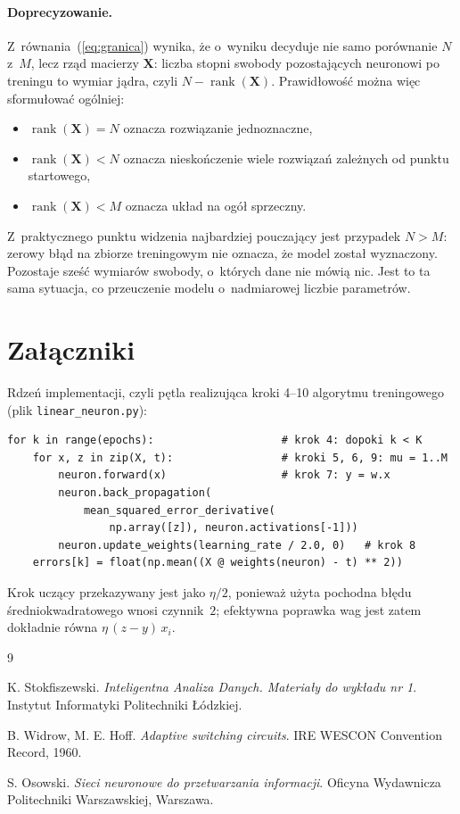 \documentclass[12pt]{article}
\begin{document}
\paragraph{Doprecyzowanie.} Z~równania~(\ref{eq:granica}) wynika, że o~wyniku
decyduje nie samo porównanie $N$ z~$M$, lecz rząd macierzy $\mathbf{X}$: liczba
stopni swobody pozostających neuronowi po treningu to wymiar jądra, czyli
$N - \operatorname{rank}(\mathbf{X})$. Prawidłowość można więc sformułować ogólniej:
\begin{itemize}
\item $\operatorname{rank}(\mathbf{X}) = N$ oznacza rozwiązanie jednoznaczne,
\item $\operatorname{rank}(\mathbf{X}) < N$ oznacza nieskończenie wiele rozwiązań
      zależnych od punktu startowego,
\item $\operatorname{rank}(\mathbf{X}) < M$ oznacza układ na ogół sprzeczny.
\end{itemize}

Z~praktycznego punktu widzenia najbardziej pouczający jest przypadek $N>M$: zerowy
błąd na zbiorze treningowym nie oznacza, że model został wyznaczony. Pozostaje
sześć wymiarów swobody, o~których dane nie mówią nic. Jest to ta sama sytuacja, co
przeuczenie modelu o~nadmiarowej liczbie parametrów.

\section{Załączniki}

Rdzeń implementacji, czyli pętla realizująca kroki 4--10 algorytmu treningowego
(plik \texttt{linear\_neuron.py}):

\begin{verbatim}
for k in range(epochs):                    # krok 4: dopoki k < K
    for x, z in zip(X, t):                 # kroki 5, 6, 9: mu = 1..M
        neuron.forward(x)                  # krok 7: y = w.x
        neuron.back_propagation(
            mean_squared_error_derivative(
                np.array([z]), neuron.activations[-1]))
        neuron.update_weights(learning_rate / 2.0, 0)   # krok 8
    errors[k] = float(np.mean((X @ weights(neuron) - t) ** 2))
\end{verbatim}

Krok uczący przekazywany jest jako $\eta/2$, ponieważ użyta pochodna błędu
średniokwadratowego wnosi czynnik~$2$; efektywna poprawka wag jest zatem dokładnie
równa $\eta\,(z-y)\,x_i$.

\begin{thebibliography}{9}

K. Stokfiszewski.
\textit{Inteligentna Analiza Danych. Materiały do wykładu nr 1}.
Instytut Informatyki Politechniki Łódzkiej.

B. Widrow, M. E. Hoff.
\textit{Adaptive switching circuits}.
IRE WESCON Convention Record, 1960.

S. Osowski.
\textit{Sieci neuronowe do przetwarzania informacji}.
Oficyna Wydawnicza Politechniki Warszawskiej, Warszawa.

\end{thebibliography}
\end{document}
